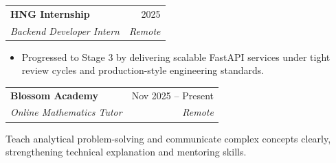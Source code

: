 \documentclass[10pt, letterpaper]{article}
\newcommand{\resumeItem}[1]{\item #1}
\newcommand{\resumeSubheading}[4]{
    \begin{tabularx}{\textwidth}{Xr}
        \textbf{#1} & #2 \\
        \textit{#3} & \textit{#4} \\
    \end{tabularx}
}
\begin{document}
\resumeSubheading
    {HNG Internship}{2025}
    {Backend Developer Intern}{Remote}
\begin{itemize}[leftmargin=0.15in, itemsep=1pt, topsep=2pt]
    \resumeItem{Progressed to Stage 3 by delivering scalable FastAPI services under tight review cycles and production-style engineering standards.}
\end{itemize}

\resumeSubheading
    {Blossom Academy}{Nov 2025 -- Present}
    {Online Mathematics Tutor}{Remote}
Teach analytical problem-solving and communicate complex concepts clearly, strengthening technical explanation and mentoring skills.
\end{document}
